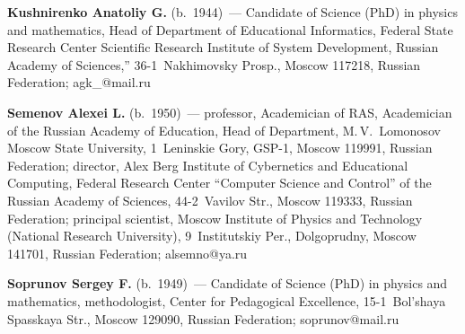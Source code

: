 \vspace*{3pt}

\noindent
\textbf{Kushnirenko Anatoliy G.} (b.\ 1944)~--- Candidate of Science (PhD) in physics and mathematics, 
Head of Department of Educational Informatics, Federal State Research Center Scientific Research Institute of System 
Development, Russian Academy of Sciences,'' 36-1~Nakhimovsky Prosp., Moscow 117218, Russian Federation; 
\mbox{agk\_@mail.ru}

\vspace*{3pt}

\noindent
\textbf{Semenov Alexei L.} (b.\ 1950)~--- %
professor, 
Academician of RAS, Academician of the Russian Academy of Education, Head of Department, 
M.\,V.~Lomonosov Moscow State University, 1~Leninskie Gory, GSP-1, Moscow 119991, Russian 
Federation; director, Alex Berg Institute of Cybernetics and Educational Computing, Federal Research Center 
``Computer Science and Control'' of the Russian Academy of Sciences, 44-2~Vavilov Str., Moscow 
119333, Russian Federation; principal scientist, Moscow Institute of Physics and Technology (National 
Research University), 9~Institutskiy Per., Dolgoprudny, Moscow 141701, Russian Federation; 
\mbox{alsemno@ya.ru}

\vspace*{3pt}

\noindent
\textbf{Soprunov Sergey F.} (b.\ 1949)~--- Candidate of Science (PhD) in physics and mathematics, 
methodologist, Center for Pedagogical Excellence, 15-1~Bol'shaya Spasskaya Str., Moscow 129090, 
Russian Federation; \mbox{soprunov@mail.ru}

\label{end\stat}

\renewcommand{\bibname}{\protect\rm Литература} 
  